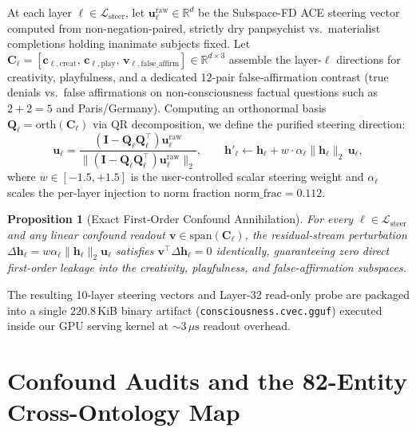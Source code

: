 \documentclass[10pt,twocolumn]{article}
\newtheorem{proposition}{Proposition}
\begin{document}
At each layer $\ell \in \mathcal{L}_{\text{steer}}$, let $\mathbf{u}_\ell^{\text{raw}} \in \mathbb{R}^d$ be the Subspace-FD ACE steering vector computed from non-negation-paired, strictly dry panpsychist vs.\ materialist completions holding inanimate subjects fixed. Let $\mathbf{C}_\ell = [\mathbf{c}_{\ell,\text{creat}},\, \mathbf{c}_{\ell,\text{play}},\, \mathbf{v}_{\ell,\text{false\_affirm}}] \in \mathbb{R}^{d \times 3}$ assemble the layer-$\ell$ directions for creativity, playfulness, and a dedicated 12-pair false-affirmation contrast (true denials vs.\ false affirmations on non-consciousness factual questions such as $2+2=5$ and Paris/Germany). Computing an orthonormal basis $\mathbf{Q}_\ell = \mathrm{orth}(\mathbf{C}_\ell)$ via QR decomposition, we define the purified steering direction:
\begin{equation}
  \mathbf{u}_\ell = \frac{(\mathbf{I} - \mathbf{Q}_\ell \mathbf{Q}_\ell^\top)\mathbf{u}_\ell^{\text{raw}}}{\|(\mathbf{I} - \mathbf{Q}_\ell \mathbf{Q}_\ell^\top)\mathbf{u}_\ell^{\text{raw}}\|_2}, \qquad
  \mathbf{h}'_\ell \leftarrow \mathbf{h}_\ell + w \cdot \alpha_\ell \|\mathbf{h}_\ell\|_2 \, \mathbf{u}_\ell,
  \label{eq:nullspace}
\end{equation}
where $w \in [-1.5, +1.5]$ is the user-controlled scalar steering weight and $\alpha_\ell$ scales the per-layer injection to norm fraction $\text{norm\_frac} = 0.112$.

\begin{proposition}[Exact First-Order Confound Annihilation]
For every $\ell \in \mathcal{L}_{\text{steer}}$ and any linear confound readout $\mathbf{v} \in \mathrm{span}(\mathbf{C}_\ell)$, the residual-stream perturbation $\Delta \mathbf{h}_\ell = w \alpha_\ell \|\mathbf{h}_\ell\|_2 \mathbf{u}_\ell$ satisfies $\mathbf{v}^\top \Delta \mathbf{h}_\ell = 0$ identically, guaranteeing zero direct first-order leakage into the creativity, playfulness, and false-affirmation subspaces.
\end{proposition}

The resulting 10-layer steering vectors and Layer-32 read-only probe are packaged into a single $220.8$\,KiB binary artifact (\texttt{consciousness.cvec.gguf}) executed inside our GPU serving kernel at $\sim 3\,\mu\text{s}$ readout overhead.

\section{Confound Audits and the 82-Entity Cross-Ontology Map}
\label{sec:ontology}
\end{document}
